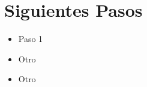 \chapter{Siguientes Pasos}
\label{chapter:next-steps}

\Blindtext[1]
\begin{itemize}
  \item Paso 1
  \item Otro
  \item Otro
\end{itemize}
